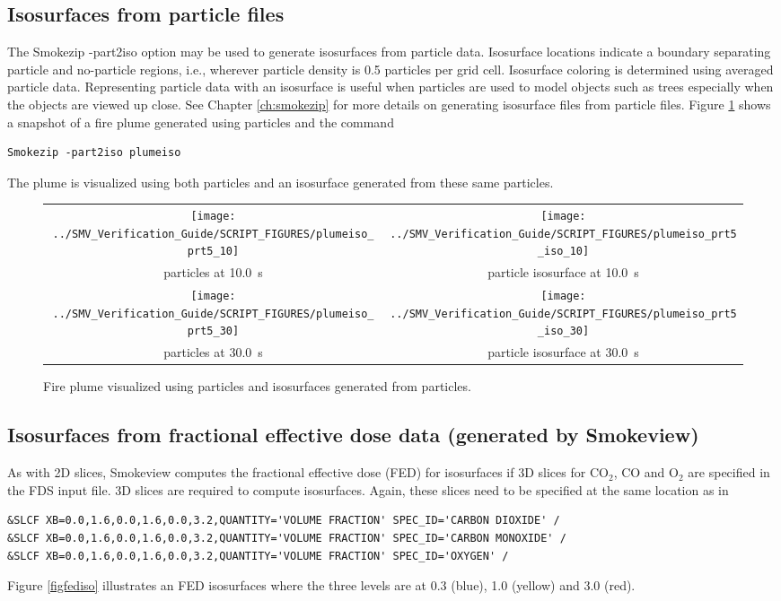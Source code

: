 \documentclass[11pt,twoside]{book}
\begin{document}
\subsection{Isosurfaces from particle files}
The Smokezip -part2iso option may be used to generate isosurfaces from particle data.
Isosurface locations indicate a boundary separating particle and
no-particle regions, i.e., wherever particle density is 0.5
particles per grid cell.  Isosurface  coloring is determined using
averaged particle data.  Representing particle data with an
isosurface is useful when particles are used to model objects such
as trees especially when the objects are viewed up close.  See
Chapter \ref{ch:smokezip} for more details on generating
isosurface files from particle files.  Figure \ref{figisoparticle}
shows a snapshot of a fire plume generated using particles and the command
\begin{lstlisting}
Smokezip -part2iso plumeiso
\end{lstlisting}
The plume is visualized using both particles and an isosurface
generated from these same particles.


\begin{figure}[\figoptions]
\begin{center}
\begin{tabular}{cc}
\texttt{[image: ../SMV\_Verification\_Guide/SCRIPT\_FIGURES/plumeiso\_prt5\_10]}&
\texttt{[image: ../SMV\_Verification\_Guide/SCRIPT\_FIGURES/plumeiso\_prt5\_iso\_10]}\\
particles at 10.0~s&particle isosurface at 10.0~s\\
\texttt{[image: ../SMV\_Verification\_Guide/SCRIPT\_FIGURES/plumeiso\_prt5\_30]}&
\texttt{[image: ../SMV\_Verification\_Guide/SCRIPT\_FIGURES/plumeiso\_prt5\_iso\_30]}\\
particles at 30.0~s&particle isosurface at 30.0~s\\
\end{tabular}
\end{center}
\caption{Fire plume visualized using particles and isosurfaces
generated from  particles.}
\label{figisoparticle}%
\end{figure}

\subsection{Isosurfaces from fractional effective dose data (generated by Smokeview)}
As with 2D slices, Smokeview computes the fractional effective dose (FED) for isosurfaces
if 3D slices for $\mathrm{CO_2}$, CO and $\mathrm{O_2}$ are
specified in the FDS input file.  3D slices are required to compute isosurfaces.
Again, these slices need to be specified at the
same location as in
\begin{lstlisting}
&SLCF XB=0.0,1.6,0.0,1.6,0.0,3.2,QUANTITY='VOLUME FRACTION' SPEC_ID='CARBON DIOXIDE' /
&SLCF XB=0.0,1.6,0.0,1.6,0.0,3.2,QUANTITY='VOLUME FRACTION' SPEC_ID='CARBON MONOXIDE' /
&SLCF XB=0.0,1.6,0.0,1.6,0.0,3.2,QUANTITY='VOLUME FRACTION' SPEC_ID='OXYGEN' /
\end{lstlisting}
Figure \ref{figfediso} illustrates
an FED isosurfaces where the three levels are at 0.3 (blue), 1.0 (yellow) and 3.0 (red).
\end{document}

